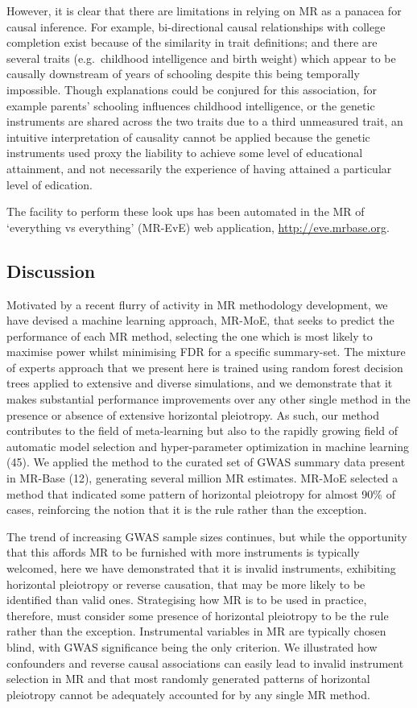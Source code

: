 \documentclass[]{article}
\begin{document}
However, it is clear that there are limitations in relying on MR as a
panacea for causal inference. For example, bi-directional causal
relationships with college completion exist because of the similarity in
trait definitions; and there are several traits (e.g.~childhood
intelligence and birth weight) which appear to be causally downstream of
years of schooling despite this being temporally impossible. Though
explanations could be conjured for this association, for example
parents' schooling influences childhood intelligence, or the genetic
instruments are shared across the two traits due to a third unmeasured
trait, an intuitive interpretation of causality cannot be applied
because the genetic instruments used proxy the liability to achieve some
level of educational attainment, and not necessarily the experience of
having attained a particular level of edication.

The facility to perform these look ups has been automated in the MR of
`everything vs everything' (MR-EvE) web application,
\url{http://eve.mrbase.org}.

\subsection{Discussion}\label{discussion}

Motivated by a recent flurry of activity in MR methodology development,
we have devised a machine learning approach, MR-MoE, that seeks to
predict the performance of each MR method, selecting the one which is
most likely to maximise power whilst minimising FDR for a specific
summary-set. The mixture of experts approach that we present here is
trained using random forest decision trees applied to extensive and
diverse simulations, and we demonstrate that it makes substantial
performance improvements over any other single method in the presence or
absence of extensive horizontal pleiotropy. As such, our method
contributes to the field of meta-learning but also to the rapidly
growing field of automatic model selection and hyper-parameter
optimization in machine learning (45). We applied the method to the
curated set of GWAS summary data present in MR-Base (12), generating
several million MR estimates. MR-MoE selected a method that indicated
some pattern of horizontal pleiotropy for almost 90\% of cases,
reinforcing the notion that it is the rule rather than the exception.

The trend of increasing GWAS sample sizes continues, but while the
opportunity that this affords MR to be furnished with more instruments
is typically welcomed, here we have demonstrated that it is invalid
instruments, exhibiting horizontal pleiotropy or reverse causation, that
may be more likely to be identified than valid ones. Strategising how MR
is to be used in practice, therefore, must consider some presence of
horizontal pleiotropy to be the rule rather than the exception.
Instrumental variables in MR are typically chosen blind, with GWAS
significance being the only criterion. We illustrated how confounders
and reverse causal associations can easily lead to invalid instrument
selection in MR and that most randomly generated patterns of horizontal
pleiotropy cannot be adequately accounted for by any single MR method.
\end{document}
